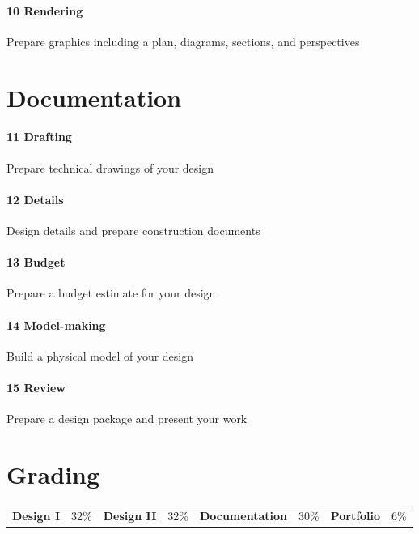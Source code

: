 \documentclass[11pt,article,oneside]{memoir}
\begin{document}
\paragraph{10 Rendering} Prepare graphics including a plan, diagrams, sections, and perspectives\dotfill

\section{Documentation}

\paragraph{11 Drafting} Prepare technical drawings of your design\dotfill

\paragraph{12 Details} Design details and prepare construction documents\dotfill

\paragraph{13 Budget} Prepare a budget estimate for your design\dotfill

\paragraph{14 Model-making} Build a physical model of your design\dotfill

\paragraph{15 Review} Prepare a design package and present your work\dotfill


\section{Grading}

\begin{table}[H]
\begin{tabular}{ @{} l @{\hskip 1em} l @{\hskip 3em} l @{\hskip 1em} l @{\hskip 3em} l @{\hskip 1em} l @{\hskip 3em} l @{\hskip 1em} l }
\textbf{Design I} & 32\% & \textbf{Design II} & 32\% & \textbf{Documentation} & 30\% & \textbf{Portfolio} & 6\% \\
\end{tabular}
\end{table}
\end{document}
